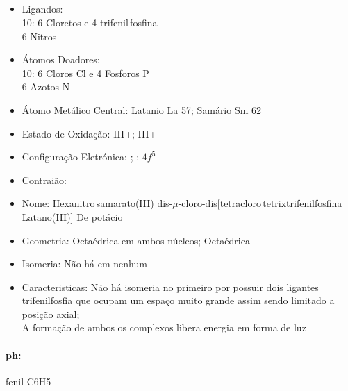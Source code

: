 \documentclass[12pt]{article}
\begin{document}
	\subsection{}
	\begin{itemize}
   
   
   \item Ligandos:\\
   	10: 6 Cloretos  e 4 trifenil\,fosfina \\
		6 Nitros 
   
   
   \item Átomos Doadores:\\
   	10: 6 Cloros Cl e 4 Fosforos P\\
		6 Azotos N
   
   \item Átomo Metálico Central:
   	Latanio La 57; 
		Samário Sm 62

   \item Estado de Oxidação:
   	III+;
		III+
   
   \item Configuração Eletrónica:
   	\ch{[Xe]};
   	\ch{[Xe]}: $ 4f^5 $
   
   \item Contraião:
   
   \item Nome: 
   	Hexanitro\,samarato(III) 
		dis-$\mu$-cloro-dis[tetracloro\,tetrixtrifenilfosfina\,Latano(III)]
		De potácio
   
   \item Geometria: 
   	Octaédrica em ambos núcleos;
		Octaédrica
   
   \item Isomeria:
   	Não há em nenhum

	\item Caracteristicas:
		Não há isomeria no primeiro por possuir dois ligantes trifenilfosfia que ocupam um espaço muito grande assim sendo limitado a posição axial;\\
		A formação de ambos os complexos libera energia em forma de luz

	\end{itemize}
	
\paragraph{ph:} fenil C6H5
	
\end{document}
